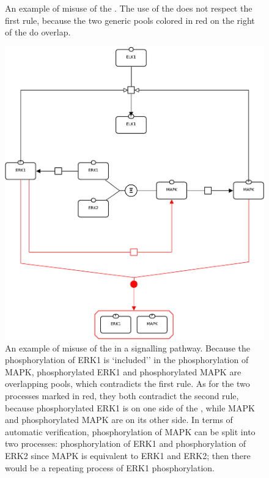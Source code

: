 \begin{figure}
\begin{center}
\end{center}
\caption{An example of misuse of the . The use of the  does not respect the first rule, because the two generic pools colored in red on the right of the  do overlap.}
\label{fig:D3_3}
\end{figure}

\begin{figure}
\begin{center}
\includegraphics[scale=0.35]{images/build/d3_1_example.pdf}
\end{center}
\caption{An example of misuse of the  in a signalling pathway.
Because the phosphorylation of ERK1 is `included'' in the phosphorylation of MAPK, phosphorylated ERK1 and phosphorylated MAPK are overlapping pools, which contradicts the first rule.
As for the two processes marked in red, they both contradict the second rule, because phosphorylated ERK1 is on one side of the , while MAPK and phosphorylated MAPK are on its other side.
In terms of automatic verification, phosphorylation of MAPK can be split into two processes: phosphorylation of ERK1 and phosphorylation of ERK2 since MAPK is equivalent to ERK1 and ERK2; then there would be a repeating process of ERK1 phosphorylation.}
\label{fig:D3_1}
\end{figure}

